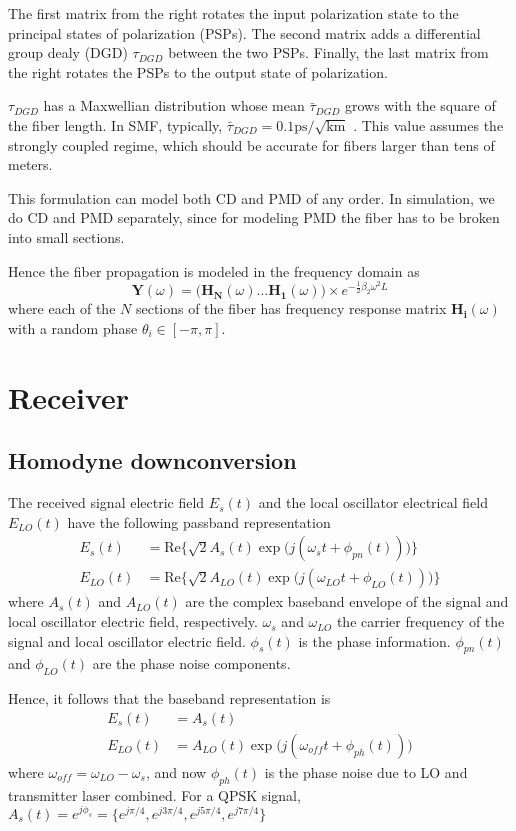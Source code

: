 \documentclass[a4paper]{article}
\begin{document}
The first matrix from the right rotates the input polarization state to the principal states of polarization (PSPs). The second matrix adds a differential group dealy (DGD) $\tau_{DGD}$ between the two PSPs. Finally, the last matrix from the right rotates the PSPs to the output state of polarization.

$\tau_{DGD}$ has a Maxwellian distribution whose mean $\bar{\tau}_{DGD}$ grows with the square of the fiber length. In SMF, typically, $\bar{\tau}_{DGD} = 0.1 \mathrm{ps/\sqrt{km}}$ \cite{Ip2008}. This value assumes the strongly coupled regime, which should be accurate for fibers larger than tens of meters.

This formulation can model both CD and PMD of any order. In simulation, we do CD and PMD separately, since for modeling PMD the fiber has to be broken into small sections.

Hence the fiber propagation is modeled in the frequency domain as
\begin{equation}
\bm{Y}(\omega) = \Big(\bm{H_N}(\omega)\ldots \bm{H_1}(\omega)\Big)\times e^{-\frac{1}{2}\beta_2\omega^2L}
\end{equation}
where each of the $N$ sections of the fiber has frequency response matrix $\bm{H_i}(\omega)$ with a random phase $\theta_i \in [-\pi, \pi]$.
\section{Receiver}
\subsection{Homodyne downconversion}
The received signal electric field $E_s(t)$ and the local oscillator electrical field $E_{LO}(t)$ have the following passband representation
\begin{align}
E_s(t) &= \mathrm{Re}\Big\{\sqrt{2}A_s(t)\exp\Big(j(\omega_st + \phi_{pn}(t))\Big)\Big\} \\
E_{LO}(t) &= \mathrm{Re}\Big\{\sqrt{2}A_{LO}(t)\exp\Big(j(\omega_{LO}t + \phi_{LO}(t))\Big)\Big\}
\end{align}
where $A_s(t)$ and $A_{LO}(t)$ are the complex baseband envelope of the signal and local oscillator electric field, respectively. $\omega_s$ and $\omega_{LO}$ the carrier frequency of the signal and local oscillator electric field. $\phi_s(t)$ is the phase information. $\phi_{pn}(t)$ and $\phi_{LO}(t)$ are the phase noise components.

Hence, it follows that the baseband representation is 
\begin{align}
E_s(t) &= A_s(t) \\
E_{LO}(t) &= A_{LO}(t)\exp\Big(j(\omega_{off}t + \phi_{ph}(t))\Big)
\end{align}
where $\omega_{off} =\omega_{LO}-\omega_s$, and now $\phi_{ph}(t)$ is the phase noise due to LO and transmitter laser combined. For a QPSK signal, $A_s(t) = e^{j\phi_s} = \{e^{j\pi/4}, e^{j3\pi/4}, e^{j5\pi/4}, e^{j7\pi/4}\}$
\end{document}
